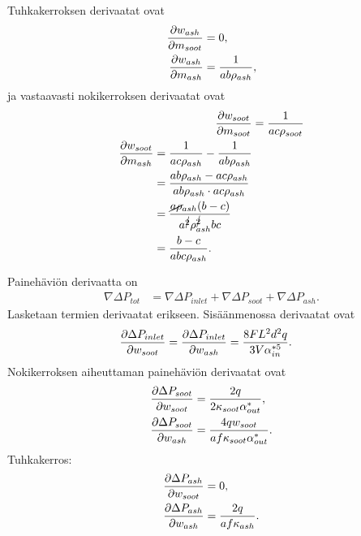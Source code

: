 Tuhkakerroksen derivaatat ovat
\begin{align}
    \frac{\partial w_{ash}}{\partial m_{soot}} & =0,\\
    \frac{\partial w_{ash}}{\partial m_{ash}} &= \frac{1}{ab\rho_{ash}},
\end{align}
ja vastaavasti nokikerroksen derivaatat ovat
\begin{align}
    \frac{\partial w_{soot}}{\partial m_{soot}} &= \frac{1}{ac\rho_{soot}}\\
    \begin{split}
    \frac{\partial w_{soot}}{\partial m_{ash}} &= \frac{1}{ac\rho_{ash}}-\frac{1}{ab\rho_{ash}}
    \\ &= \frac{ab \rho_{ash} - ac\rho_{ash}}{ab\rho_{ash}\cdot ac \rho_{ash}}
    \\ &= \frac{\cancel{a\rho}_{ash}(b-c)}{a^{\cancel{2}} \rho_{ash}^{\cancel{2}} bc}
    \\ &= \frac{b-c}{abc\rho_{ash}}.
    \end{split}
\end{align}

Painehäviön derivaatta on
\begin{align}
    \nabla \Delta P_{tot} &=
    \nabla \Delta P_{inlet} + \nabla \Delta P_{soot} + \nabla \Delta P_{ash}.
\end{align}
Lasketaan termien derivaatat erikseen. Sisäänmenossa derivaatat ovat
\begin{align}
    \frac{\partial \Delta P_{inlet}}{\partial w_{soot}} &=
    \frac{\partial \Delta P_{inlet}}{\partial w_{ash}} =
    \frac{8 F L^2 d^2 q}{3 V \alpha_{in}^{*5}} .
\end{align}
Nokikerroksen aiheuttaman painehäviön derivaatat ovat
\begin{align}
    \frac{\partial \Delta P_{soot}}{\partial w_{soot}} &=
    \frac{2 q}{2 \kappa_{soot} \alpha_{out}^*},
    \\\frac{\partial \Delta P_{soot}}{\partial w_{ash}}
    &=
    \frac{4qw_{soot}}{a f\kappa_{soot} \alpha_{out}^* }.
\end{align}
Tuhkakerros:
\begin{align}
    \frac{\partial \Delta P_{ash}}{\partial w_{soot}} &= 0,
    \\\frac{\partial \Delta P_{ash}}{\partial w_{ash}} &=
    \frac{2q}{a f \kappa_{ash}  }.
\end{align}

